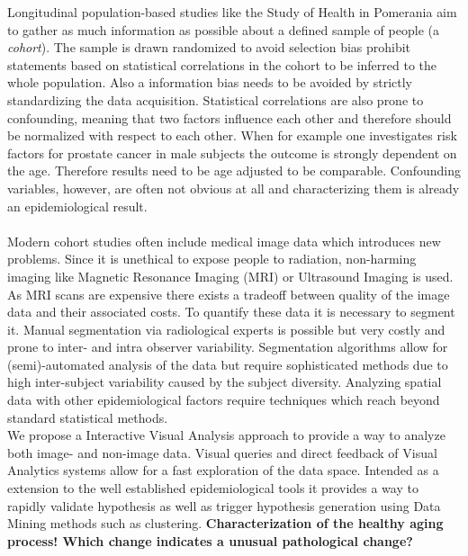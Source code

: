 \documentclass[journal]{style/vgtc}           %
\begin{document}
Longitudinal population-based studies like the Study of Health in Pomerania \cite{Volzke2011} aim to gather as much information as possible about a defined sample of people (a \emph{cohort}).
%
The sample is drawn randomized to avoid selection bias prohibit statements based on statistical correlations in the cohort to be inferred to the whole population.
%
Also a information bias needs to be avoided by strictly standardizing the data acquisition.
%
Statistical correlations are also prone to confounding, meaning that two factors influence each other and therefore should be normalized with respect to each other.
%
When for example one investigates risk factors for prostate cancer in male subjects the outcome is strongly dependent on the age.
%
Therefore results need to be age adjusted to be comparable.
%
Confounding variables, however, are often not obvious at all and characterizing them is already an epidemiological result.
\\\\
Modern cohort studies often include medical image data which introduces new problems.
%
Since it is unethical to expose people to radiation, non-harming imaging like Magnetic Resonance Imaging (MRI) or Ultrasound Imaging is used.
%
As MRI scans are expensive there exists a tradeoff between quality of the image data and their associated costs.
%
To quantify these data it is necessary to segment it.
%
Manual segmentation via radiological experts is possible but very costly and prone to inter- and intra observer variability.
%
Segmentation algorithms allow for (semi)-automated analysis of the data but require sophisticated methods due to high inter-subject variability caused by the subject diversity.
%
Analyzing spatial data with other epidemiological factors require techniques which reach beyond standard statistical methods.
\\
We propose a Interactive Visual Analysis approach to provide a way to analyze both image- and non-image data.
%
Visual queries and direct feedback of Visual Analytics systems allow for a fast exploration of the data space.
%
Intended as a extension to the well established epidemiological tools it provides a way to rapidly validate hypothesis as well as trigger hypothesis generation using Data Mining methods such as clustering.
%
\textbf{Characterization of the healthy aging process! Which change indicates a unusual pathological change?}


\end{document}
